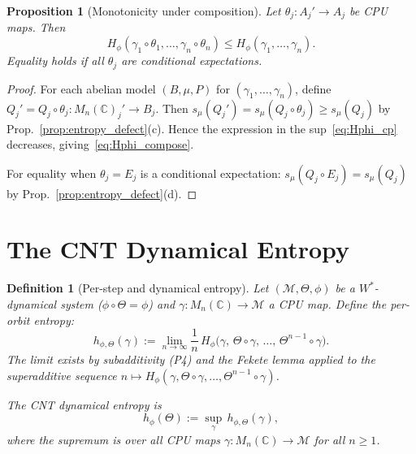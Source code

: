 \documentclass[12pt,a4paper]{article}
\newtheorem{proposition}[theorem]{Proposition}
\newtheorem{definition}[theorem]{Definition}
\newcommand{\CC}{\mathbb{C}}
\newcommand{\Mn}{M_n(\CC)}
\newcommand{\vN}{\mathcal{M}}      %
\newcommand{\thetaaut}{\Theta}
\newcommand{\Hphi}{H_{\phi}}
\newcommand{\hphi}{h_{\phi}}
\begin{document}
\begin{proposition}[Monotonicity under composition]\label{prop:Hphi_monotone}
Let $\theta_j:A_j'\to A_j$ be CPU maps.  Then
\begin{equation}\label{eq:Hphi_compose}
  \Hphi(\gamma_1\circ\theta_1,\ldots,\gamma_n\circ\theta_n)
  \le \Hphi(\gamma_1,\ldots,\gamma_n).
\end{equation}
Equality holds if all $\theta_j$ are conditional expectations.
\end{proposition}

\begin{proof}
For each abelian model $(B,\mu,P)$ for $(\gamma_1,\ldots,\gamma_n)$, define
$Q_j'=Q_j\circ\theta_j:\Mn_j'\to B_j$.  Then
$s_\mu(Q_j') = s_\mu(Q_j\circ\theta_j)\ge s_\mu(Q_j)$ by
Prop.~\ref{prop:entropy_defect}(c).  Hence the expression in the sup~\eqref{eq:Hphi_cp}
decreases, giving~\eqref{eq:Hphi_compose}.

For equality when $\theta_j=E_j$ is a conditional expectation:
$s_\mu(Q_j\circ E_j)=s_\mu(Q_j)$ by Prop.~\ref{prop:entropy_defect}(d).
\end{proof}

\section{The CNT Dynamical Entropy}
\label{sec:dynamical}

\begin{definition}[Per-step and dynamical entropy]\label{def:cnt_dynamical}
Let $(\vN,\thetaaut,\phi)$ be a $W^*$-dynamical system ($\phi\circ\thetaaut=\phi$)
and $\gamma:\Mn\to\vN$ a CPU map.  Define the \emph{per-orbit entropy}:
\begin{equation}\label{eq:h_orbit}
  h_{\phi,\thetaaut}(\gamma)
  := \lim_{n\to\infty} \frac{1}{n}\,
     \Hphi\!\bigl(\gamma,\,\thetaaut\circ\gamma,\,\ldots,\,\thetaaut^{n-1}\circ\gamma\bigr).
\end{equation}
The limit exists by subadditivity (P4) and the Fekete lemma applied to the
superadditive sequence $n\mapsto\Hphi(\gamma,\thetaaut\circ\gamma,\ldots,\thetaaut^{n-1}\circ\gamma)$.

The \emph{CNT dynamical entropy} is
\begin{equation}\label{eq:cnt_entropy}
  \hphi(\thetaaut) := \sup_\gamma\, h_{\phi,\thetaaut}(\gamma),
\end{equation}
where the supremum is over all CPU maps $\gamma:\Mn\to\vN$ for all $n\ge 1$.
\end{definition}
\end{document}
